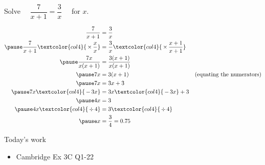 \documentclass[aspectratio=169,10pt]{beamer}
\begin{document}
\begin{frame}
\small
  \begin{example}
    Solve $\quad\dfrac{7}{x+1}=\dfrac{3}{x}\quad$ for $x$.
  \end{example}
  \begin{solution}[]\vspace{-2em}
    \[
      \begin{aligned}
         \frac{7}{x+1}&=\frac{3}{x}\\\pause
         \frac{7}{x+1}\textcolor{col4}{\,\times\,\frac{x}{x}}&=\frac{3}{x}\textcolor{col4}{\,\times\,\frac{x+1}{x+1}}\\\pause
         \frac{7x}{x(x+1)}&=\frac{3(x+1)}{x(x+1)}\\\pause
         7x&=3(x+1)&\text{(equating the numerators)}\\\pause
         7x&=3x+3\\\pause
         7x\textcolor{col4}{\,-\,3x}&=3x\textcolor{col4}{\,-\,3x}+3\\\pause
         4x&=3\\\pause
         4x\textcolor{col4}{\,\div\,4}&=3\textcolor{col4}{\,\div\,4}\\\pause
         x&=\frac{3}{4}=0.75\\
      \end{aligned}
      \]
  \end{solution}
\end{frame}

\begin{frame}{Today's work}
  \begin{itemize} 
    \item Cambridge Ex 3C Q1-22
  \end{itemize}
\end{frame}
\end{document}
